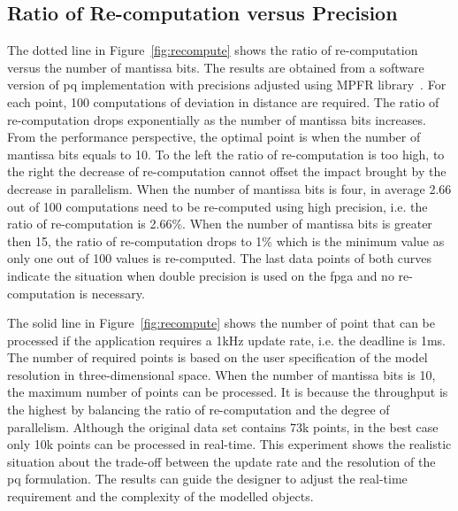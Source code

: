 \subsection{Ratio of Re-computation versus Precision}
\label{sec:precision_recompute}
The dotted line in Figure~\ref{fig:recompute} shows the ratio of re-computation versus the number of mantissa bits.
The results are obtained from a software version of \gls{pq} implementation with precisions adjusted using MPFR library~\cite{fousse07}.
For each point, 100 computations of deviation in distance are required.
The ratio of re-computation drops exponentially as the number of mantissa bits increases.
From the performance perspective, the optimal point is when the number of mantissa bits equals to 10.
To the left the ratio of re-computation is too high, to the right the decrease of re-computation cannot offset the impact brought by the decrease in parallelism.
When the number of mantissa bits is four, in average 2.66 out of 100 computations need to be re-computed using high precision, i.e. the ratio of re-computation is 2.66\%.
When the number of mantissa bits is greater then 15, the ratio of re-computation drops to 1\% which is the minimum value as only one out of 100 values is re-computed.
The last data points of both curves indicate the situation when double precision is used on the \gls{fpga} and no re-computation is necessary.

The solid line in Figure~\ref{fig:recompute} shows the number of point that can be processed if the application requires a 1kHz update rate, i.e. the deadline is 1ms.
The number of required points is based on the user specification of the model resolution in three-dimensional space.
When the number of mantissa bits is 10, the maximum number of points can be processed.
It is because the throughput is the highest by balancing the ratio of re-computation and the degree of parallelism.
Although the original data set contains 73k points, in the best case only 10k points can be processed in real-time.
This experiment shows the realistic situation about the trade-off between the update rate and the resolution of the \gls{pq} formulation.
The results can guide the designer to adjust the real-time requirement and the complexity of the modelled objects.

